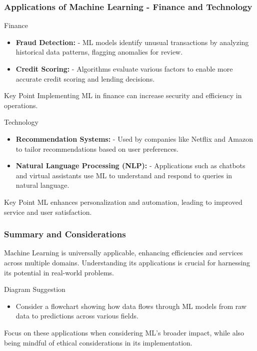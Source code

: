 \documentclass[aspectratio=169]{beamer}
\begin{document}
\begin{frame}[fragile]
    \frametitle{Applications of Machine Learning - Finance and Technology}
    \begin{block}{Finance}
        \begin{itemize}
            \item \textbf{Fraud Detection:} 
                - ML models identify unusual transactions by analyzing historical data patterns, flagging anomalies for review.
            \item \textbf{Credit Scoring:} 
                - Algorithms evaluate various factors to enable more accurate credit scoring and lending decisions.
        \end{itemize}
        \begin{block}{Key Point}
            Implementing ML in finance can increase security and efficiency in operations.
        \end{block}
    \end{block}
    
    \begin{block}{Technology}
        \begin{itemize}
            \item \textbf{Recommendation Systems:} 
                - Used by companies like Netflix and Amazon to tailor recommendations based on user preferences.
            \item \textbf{Natural Language Processing (NLP):} 
                - Applications such as chatbots and virtual assistants use ML to understand and respond to queries in natural language.
        \end{itemize}
        \begin{block}{Key Point}
            ML enhances personalization and automation, leading to improved service and user satisfaction.
        \end{block}
    \end{block}
\end{frame}

\begin{frame}[fragile]
    \frametitle{Summary and Considerations}
    Machine Learning is universally applicable, enhancing efficiencies and services across multiple domains. Understanding its applications is crucial for harnessing its potential in real-world problems.

    \begin{block}{Diagram Suggestion}
        \begin{itemize}
            \item Consider a flowchart showing how data flows through ML models from raw data to predictions across various fields.
        \end{itemize}
    \end{block}
    
    Focus on these applications when considering ML's broader impact, while also being mindful of ethical considerations in its implementation.
\end{frame}
\end{document}
